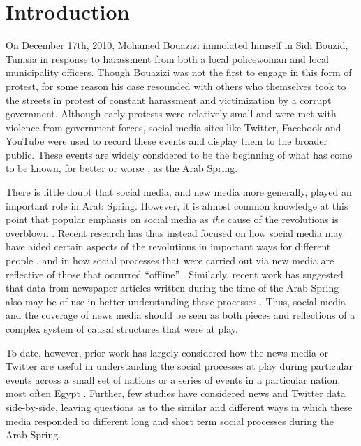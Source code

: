 \section{Introduction}
On December 17th, 2010, Mohamed Bouazizi immolated himself in Sidi Bouzid, Tunisia in response to harassment from both a local policewoman and local municipality officers.  Though Bouazizi was not the first to engage in this form of protest, for some reason his case resounded with others who themselves took to the streets in protest of constant harassment and victimization by a corrupt government.  Although early protests were relatively small and were met with violence from government forces, social media sites like Twitter, Facebook and YouTube were used to record these events and display them to the broader public.  These events are widely considered to be the beginning of what has come to be known, for better or worse \citep{gelvin_arab_2015}, as the Arab Spring.

There is little doubt that social media, and new media \citep{baym_personal_2010} more generally, played an important role in Arab Spring. However, it is almost common knowledge at this point that popular emphasis on social media as \emph{the} cause of the revolutions is overblown \citep{bruns_arab_2013,goldstone_bringing_2013,comunello_will_2012}. Recent research has thus instead focused on how social media may have aided certain aspects of the revolutions in important ways for different people  \citep{galle_who_2013,starbird_how_2012,lotan_revolutions_2011,tufekci_social_2012}, and in how social processes that were carried out via new media are reflective of those that occurred ``offline'' \citep{comunello_will_2012}. Similarly, recent work has suggested that data from newspaper articles written during the time of the Arab Spring also may be of use in better understanding these processes \citep{joseph_arab_2014,pfeffer_rapid_2012}. Thus, social media and the coverage of news media should be seen as both pieces and reflections of a complex system of causal structures that were at play.  

To date, however, prior work has largely considered how the news media or Twitter are useful in understanding the social processes at play during particular events across a small set of nations \citep{} or a series of events in a particular nation, most often Egypt \citep{}.  Further, few studies have considered news and Twitter data side-by-side, leaving questions as to the similar and different ways in which these media responded to different long and short term social processes during the Arab Spring. 


